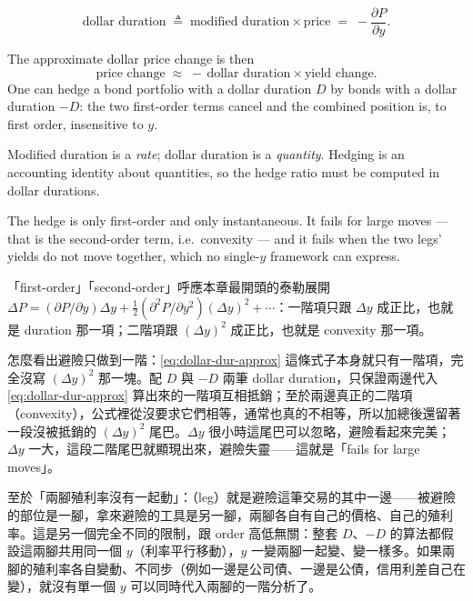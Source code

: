 \begin{definition}
	\begin{equation}
		\text{dollar duration} \;\triangleq\; \text{modified duration} \times \text{price} \;=\; -\frac{\partial P}{\partial y}. \label{eq:dollar-dur}
	\end{equation}
\end{definition}

The approximate dollar price change is then
\begin{equation}
	\text{price change} \;\approx\; -\,\text{dollar duration} \times \text{yield change}. \label{eq:dollar-dur-approx}
\end{equation}
One can hedge a bond portfolio with a dollar duration $D$ by bonds with a dollar duration $-D$: the two first-order terms cancel and the combined position is, to first order, insensitive to $y$.

\suppstart
\begin{intuition}
	Modified duration is a \emph{rate}; dollar duration is a \emph{quantity}.
	Hedging is an accounting identity about quantities, so the hedge ratio must be computed in dollar durations.
\end{intuition}

\begin{note}
	The hedge is only first-order and only instantaneous.
	It fails for large moves --- that is the second-order term, i.e.\ convexity --- and it fails when the two legs' yields do not move together, which no single-$y$ framework can express.
\end{note}

\begin{remark}
	「first-order」「second-order」呼應本章最開頭的泰勒展開 $\Delta P=(\partial P/\partial y)\Delta y+\frac12(\partial^{2}P/\partial y^{2})(\Delta y)^{2}+\cdots$：一階項只跟 $\Delta y$ 成正比，也就是 duration 那一項；二階項跟 $(\Delta y)^{2}$ 成正比，也就是 convexity 那一項。

	怎麼看出避險只做到一階：\eqref{eq:dollar-dur-approx} 這條式子本身就只有一階項，完全沒寫 $(\Delta y)^{2}$ 那一塊。配 $D$ 與 $-D$ 兩筆 dollar duration，只保證兩邊代入 \eqref{eq:dollar-dur-approx} 算出來的一階項互相抵銷；至於兩邊真正的二階項（convexity），公式裡從沒要求它們相等，通常也真的不相等，所以加總後還留著一段沒被抵銷的 $(\Delta y)^{2}$ 尾巴。$\Delta y$ 很小時這尾巴可以忽略，避險看起來完美；$\Delta y$ 一大，這段二階尾巴就顯現出來，避險失靈——這就是「fails for large moves」。

	至於「兩腳殖利率沒有一起動」：（leg）就是避險這筆交易的其中一邊——被避險的部位是一腳，拿來避險的工具是另一腳，兩腳各自有自己的價格、自己的殖利率。這是另一個完全不同的限制，跟 order 高低無關：整套 $D$、$-D$ 的算法都假設這兩腳共用同一個 $y$（利率平行移動），$y$ 一變兩腳一起變、變一樣多。如果兩腳的殖利率各自變動、不同步（例如一邊是公司債、一邊是公債，信用利差自己在變），就沒有單一個 $y$ 可以同時代入兩腳的一階分析了。
\end{remark}
\suppend

